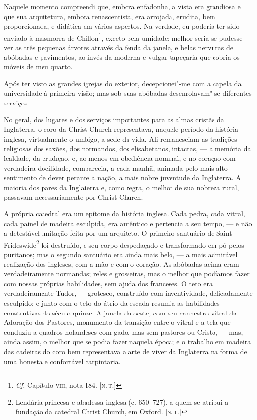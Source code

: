Naquele momento compreendi que, embora enfadonha, a vista era grandiosa
e que sua arquitetura, embora renascentista, era arrojada, erudita, bem
proporcionada, e didática em vários aspectos. Na verdade, eu poderia ter
sido enviado à masmorra de Chillon\footnote{\emph{Cf.} Capítulo \textsc{viii},
  nota 184. {[}\textsc{n.\,t.}{]}}, exceto pela umidade; melhor seria se
pudesse ver as três pequenas árvores através da fenda da janela, e belas
nervuras de abóbadas e pavimentos, ao invés da moderna e vulgar
tapeçaria que cobria os móveis de meu quarto.

Após ter visto as grandes igrejas do exterior, decepcionei"-me com a
capela da universidade à primeira visão; mas sob suas abóbadas
desenrolavam"-se diferentes serviços.

No geral, dos lugares e dos serviços importantes para as almas cristãs
da Inglaterra, o coro da Christ Church representava, naquele período da
história inglesa, virtualmente o umbigo, a sede da vida. Ali remanesciam
as tradições religiosas dos saxões, dos normandos, dos elisabetanos,
intactas, --- a memória da lealdade, da erudição, e, ao menos em
obediência nominal, e no coração com verdadeira docilidade, comparecia,
a cada manhã, animada pelo mais alto sentimento de dever perante a
nação, a mais nobre juventude da Inglaterra. A maioria dos pares da
Inglaterra e, como regra, o melhor de sua nobreza rural, passavam
necessariamente por Christ Church.

A própria catedral era um epítome da história inglesa. Cada pedra, cada
vitral, cada painel de madeira esculpida, era autêntico e pertencia a
seu tempo, --- e não a detestável imitação feita por um arquiteto. O
primeiro santuário de Saint Frideswide\footnote{Lendária princesa e
  abadessa inglesa (c. 650--727), a quem se atribui a fundação da catedral
  Christ Church, em Oxford. {[}\textsc{n.\,t.}{]}} foi destruído, e seu corpo
despedaçado e transformado em pó pelos puritanos; mas o segundo
santuário era ainda mais belo, --- a mais admirável realização dos
ingleses, com a mão e com o coração. As abóbadas acima eram
verdadeiramente normandas; reles e grosseiras, mas o melhor que podíamos
fazer com nossas próprias habilidades, sem ajuda dos franceses. O teto
era verdadeiramente Tudor, --- grotesco, construído com inventividade,
delicadamente esculpido; e junto com o teto do átrio da escada resumia
as habilidades construtivas do século quinze. A janela do oeste, com seu
canhestro vitral da Adoração dos Pastores, monumento da transição entre
o vitral e a tela que conduziu a quadros holandeses com gado, mas sem
pastores ou Cristo, --- mas, ainda assim, o melhor que se podia fazer
naquela época; e o trabalho em madeira das cadeiras do coro bem
representava a arte de viver da Inglaterra na forma de uma honesta e
confortável carpintaria.

